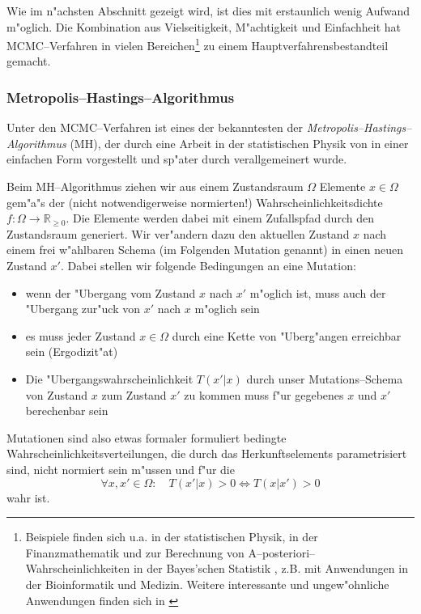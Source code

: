 	Wie im n"achsten Abschnitt gezeigt wird, ist dies mit erstaunlich wenig Aufwand m"oglich. Die Kombination aus Vielseitigkeit, M"achtigkeit und Einfachheit hat MCMC--Verfahren in vielen Bereichen\footnote{Beispiele finden sich u.a. in der statistischen Physik, in der Finanzmathematik und zur Berechnung von A--posteriori--Wahrscheinlichkeiten in der Bayes'schen Statistik \citep{Geweke:1989p10465}, z.B. mit Anwendungen in der Bioinformatik und Medizin. Weitere interessante und ungew"ohnliche Anwendungen finden sich in \citep{Diaconis:2009p4122}} zu einem Hauptverfahrensbestandteil gemacht.
	
	
	\subsubsection{Metropolis--Hastings--Algorithmus}
	Unter den MCMC--Verfahren ist eines der bekanntesten der {\em Metropolis--Hastings--Algorithmus} (MH), der durch eine Arbeit in der statistischen Physik von \citet{Metropolis:1953p3364} in einer einfachen Form vorgestellt und sp"ater durch \citet{Hastings:1970p3387} verallgemeinert wurde.

	Beim MH--Algorithmus ziehen wir aus einem Zustandsraum $\Omega$ Elemente $x \in \Omega$ gem"a"s der (nicht notwendigerweise normierten!) Wahrscheinlichkeitsdichte $f : \Omega \rightarrow \mathbb{R}_{\geq 0}$. Die Elemente werden dabei mit einem Zufallspfad durch den Zustandsraum generiert. Wir ver"andern dazu den aktuellen Zustand $x$ nach einem frei w"ahlbaren Schema (im Folgenden Mutation genannt) in einen neuen Zustand $x'$.
	Dabei stellen wir folgende Bedingungen an eine Mutation:
	\begin{itemize}
		\item{wenn der "Ubergang vom Zustand $x$ nach $x'$ m"oglich ist, muss auch der "Ubergang zur"uck von $x'$ nach $x$ m"oglich sein}
		\item{es muss jeder Zustand $x \in \Omega$ durch eine Kette von "Uberg"angen erreichbar sein (Ergodizit"at)}
		\item{Die "Ubergangswahrscheinlichkeit $T(x'|x)$ durch unser Mutations--Schema von Zustand $x$ zum Zustand $x'$ zu kommen muss f"ur gegebenes $x$ und $x'$ berechenbar sein}
	\end{itemize}
	Mutationen sind also etwas formaler formuliert bedingte Wahrscheinlichkeitsverteilungen, die durch das Herkunftselements parametrisiert sind, nicht normiert sein m"ussen und f"ur die
	$$\forall x,x'\in\Omega : \quad T(x'|x)>0 \Leftrightarrow T(x|x')>0$$
	wahr ist.
	
